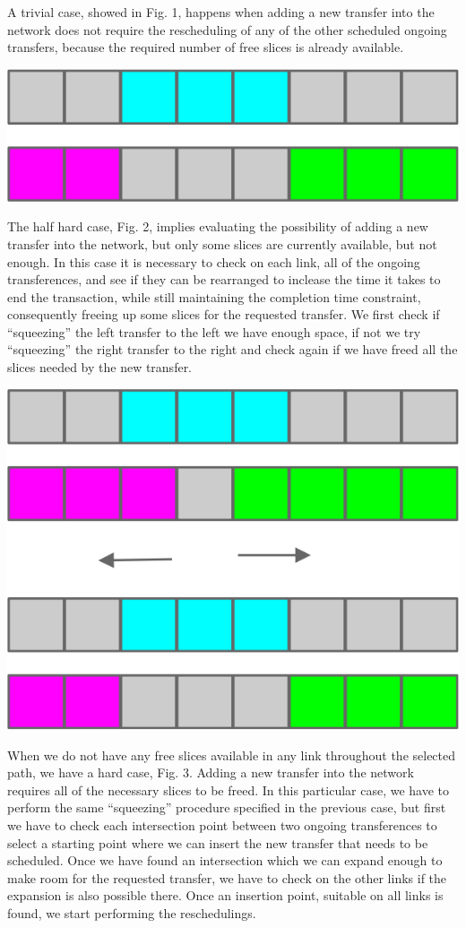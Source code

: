 \documentclass[11pt,a4paper]{article}
\begin{document}
A trivial case, showed in Fig. 1, happens when adding a new transfer into the network does not require the rescheduling of any of the other scheduled ongoing transfers, because the required number of free slices is already available.

\includegraphics[scale=1]{trivialcase.jpg}

The half hard case, Fig. 2, implies evaluating the possibility of adding a new transfer into the network, but only some slices are currently available, but not enough. In this case it is necessary to check on each link, all of the ongoing transferences, and see if they can be rearranged to inclease the time it takes to end the transaction, while still maintaining the completion time constraint, consequently freeing up some slices for the requested transfer. We first check if “squeezing” the left transfer to the left we have enough space, if not we try “squeezing” the right transfer to the right and check again if we have freed all the slices needed by the new transfer. 

\includegraphics[scale=1]{halfhardcase.jpg}

When we do not have any free slices available in any link throughout the selected path, we have a hard case, Fig. 3. Adding a new transfer into the network requires all of the necessary slices to be freed. In this particular case, we have to perform the same “squeezing” procedure specified in the previous case, but first we have to check each intersection point between two ongoing transferences to select a starting point where we can insert the new transfer that needs to be scheduled. Once we have found an intersection which we can expand enough to make room for the requested transfer, we have to check on the other links if the expansion is also possible there. Once an insertion point, suitable on all links is found, we start performing the reschedulings.
\end{document}

